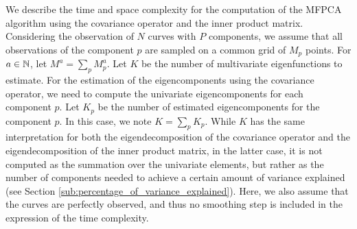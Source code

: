We describe the time and space complexity for the computation of the MFPCA algorithm using the covariance operator and the inner product matrix. Considering the observation of $N$ curves with $P$ components, we assume that all observations of the component $p$ are sampled on a common grid of $M_p$ points. For $a \in \mathbb{N}$, let $M^a = \sum_{p} M_p^a$. Let $K$ be the number of multivariate eigenfunctions to estimate. For the estimation of the eigencomponents using the covariance operator, we need to compute the univariate eigencomponents for each component $p$. Let $K_p$ be the number of estimated eigencomponents for the component $p$. In this case, we note $K = \sum_{p} K_p$. While $K$ has the same interpretation for both the eigendecomposition of the covariance operator and the eigendecomposition of the inner product matrix, in the latter case, it is not computed as the summation over the univariate elements, but rather as the number of components needed to achieve a certain amount of variance explained (see Section \ref{sub:percentage_of_variance_explained}). Here, we also assume that the curves are perfectly observed, and thus no smoothing step is included in the expression of the time complexity. 

